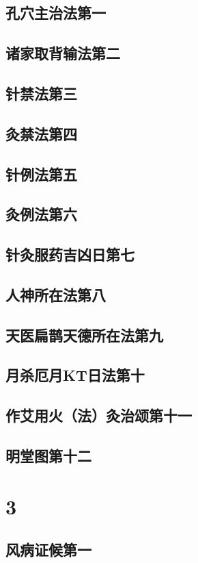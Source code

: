 \documentclass[a4paper,12pt,UTF8,twoside]{ctexbook}
\begin{document}
\chapter{孔穴主治法第一}
\chapter{诸家取背输法第二}
\chapter{针禁法第三}
\chapter{灸禁法第四}
\chapter{针例法第五}
\chapter{灸例法第六}
\chapter{针灸服药吉凶日第七}
\chapter{人神所在法第八}
\chapter{天医扁鹊天德所在法第九}
\chapter{月杀厄月KT日法第十}
\chapter{作艾用火（法）灸治颂第十一}
\chapter{明堂图第十二}

\part{3}
\chapter{风病证候第一}
\end{document}
